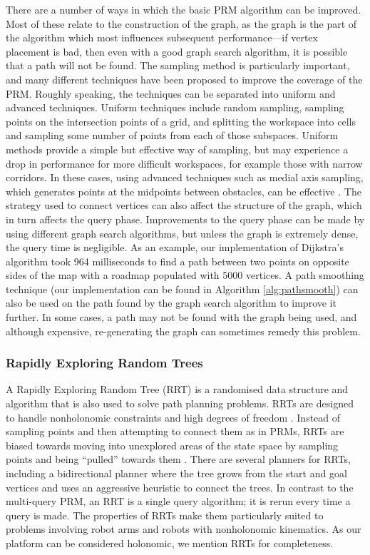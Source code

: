 \documentclass[conference]{IEEEtran}
\begin{document}
There are a number of ways in which the basic PRM algorithm can be improved. Most of these relate to the construction of the graph, as the graph is the part of the algorithm which most influences subsequent performance---if vertex placement is bad, then even with a good graph search algorithm, it is possible that a path will not be found. The sampling method is particularly important, and many different techniques have been proposed to improve the coverage of the PRM. Roughly speaking, the techniques can be separated into uniform and advanced techniques. Uniform techniques include random sampling, sampling points on the intersection points of a grid, and splitting the workspace into cells and sampling some number of points from each of those subspaces. Uniform methods provide a simple but effective way of sampling, but may experience a drop in performance for more difficult workspaces, for example those with narrow corridors. In these cases, using advanced techniques such as medial axis sampling, which generates points at the midpoints between obstacles, can be effective \cite{sampling}. The strategy used to connect vertices can also affect the structure of the graph, which in turn affects the query phase. Improvements to the query phase can be made by using different graph search algorithms, but unless the graph is extremely dense, the query time is negligible. As an example, our implementation of Dijkstra's algorithm took 964 milliseconds to find a path between two points on opposite sides of the map with a roadmap populated with 5000 vertices. A path smoothing technique (our implementation can be found in Algorithm \ref{alg:pathsmooth}) can also be used on the path found by the graph search algorithm to improve it further. In some cases, a path may not be found with the graph being used, and although expensive, re-generating the graph can sometimes remedy this problem.

\subsubsection{Rapidly Exploring Random Trees}
A Rapidly Exploring Random Tree (RRT) is a randomised data structure and algorithm that is also used to solve path planning problems. RRTs are designed to handle nonholonomic constraints and high degrees of freedom \cite{rrt}. Instead of sampling points and then attempting to connect them as in PRMs, RRTs are biased towards moving into unexplored areas of the state space by sampling points and being ``pulled'' towards them \cite{rrtprog}. There are several planners for RRTs, including a bidirectional planner where the tree grows from the start and goal vertices and uses an aggressive heuristic to connect the trees. In contrast to the multi-query PRM, an RRT is a single query algorithm; it is rerun every time a query is made. The properties of RRTs make them particularly suited to problems involving robot arms and robots with nonholonomic kinematics. As our platform can be considered holonomic, we mention RRTs for completeness.
\end{document}
